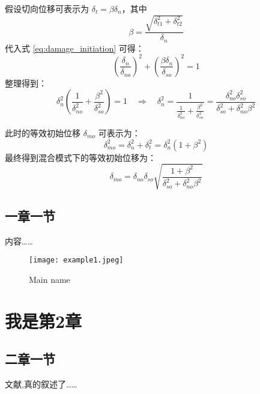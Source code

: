 假设切向位移可表示为 $\delta_t = \beta \delta_n$，其中
\begin{equation}
\beta = \frac{\sqrt{\delta_{t1}^2 + \delta_{t2}^2}}{\delta_n}
\label{eq:beta_def}
\end{equation}
代入式 \eqref{eq:damage_initiation} 可得：
\begin{equation}
\left( \frac{\delta_n}{\delta_{no}} \right)^2 + \left( \frac{\beta \delta_n}{\delta_{so}} \right)^2 = 1
\end{equation}
整理得到：
\begin{equation}
\delta_n^2 \left( \frac{1}{\delta_{no}^2} + \frac{\beta^2}{\delta_{so}^2} \right) = 1
\quad \Rightarrow \quad
\delta_n^2 = \frac{1}{\frac{1}{\delta_{no}^2} + \frac{\beta^2}{\delta_{so}^2}} = \frac{\delta_{no}^2 \delta_{so}^2}{\delta_{so}^2 + \delta_{no}^2 \beta^2}
\end{equation}

此时的等效初始位移 $\delta_{mo}$ 可表示为：
\begin{equation}
\delta_{mo}^2 = \delta_n^2 + \delta_t^2 = \delta_n^2(1 + \beta^2)
\end{equation}
最终得到混合模式下的等效初始位移为：
\begin{equation}
\delta_{mo} = \delta_{no} \delta_{so} \sqrt{ \frac{1 + \beta^2}{\delta_{so}^2 + \delta_{no}^2 \beta^2} }
\label{eq:delta_mo}
\end{equation}

\section{一章一节}
内容……

\begin{figure}[H] %
    \centering %
    \texttt{[image: example1.jpeg]} %
    \caption{Main name} %
    \label{Fig.main1} %
    \end{figure}

\chapter{我是第2章}
\section{二章一节}
文献\cite{li2023deep1,li2023deep2,li2023deep3},真的\cite{li2023deep1}叙述了……

